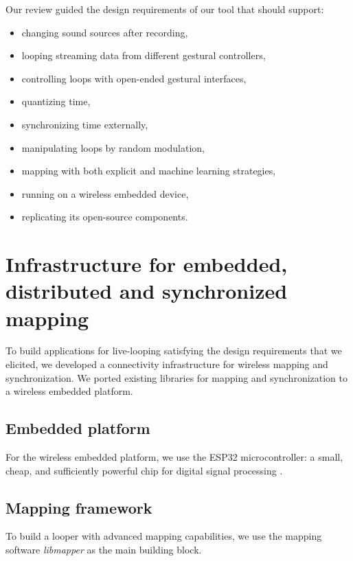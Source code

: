 \documentclass[sigconf]{nimeart}
\begin{document}
Our review guided the design requirements of our tool that should support:

\begin{itemize}
\item
  changing sound sources after recording,
\item
  looping streaming data from different gestural controllers,
\item
  controlling loops with open-ended gestural interfaces,
\item
  quantizing time,
\item
  synchronizing time externally,
\item
  manipulating loops by random modulation,
\item
  mapping with both explicit and machine learning strategies,
\item
  running on a wireless embedded device,
\item
  replicating its open-source components.
\end{itemize}

\section{Infrastructure for embedded, distributed and synchronized mapping}\label{infrastructure-for-embedded-distributed-and-synchronized-mapping}

To build applications for live-looping satisfying the design requirements that we elicited, we developed a connectivity infrastructure for wireless mapping and synchronization. We ported existing libraries for mapping and synchronization to a wireless embedded platform.

\subsection{Embedded platform}\label{embedded-platform}

For the wireless embedded platform, we use the ESP32 microcontroller: a small, cheap, and sufficiently powerful chip for digital signal processing \cite{c20}.

\subsection{Mapping framework}\label{mapping-framework}

To build a looper with advanced mapping capabilities, we use the mapping software \emph{libmapper} \cite{c21} as the main building block.
\end{document}
